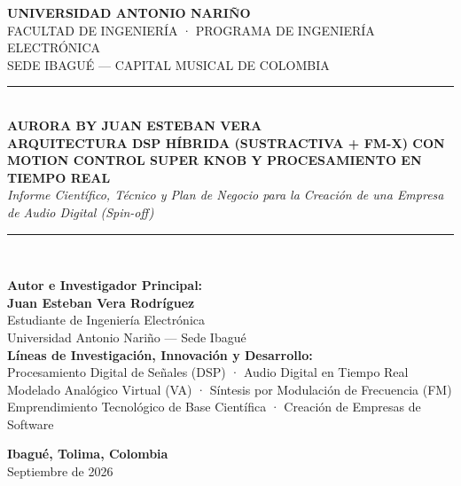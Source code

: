 \documentclass[11pt,a4paper]{article}
\begin{document}
\begin{titlepage}
    \centering
    \vspace*{0.5cm}
    
    {\scshape\LARGE \textbf{UNIVERSIDAD ANTONIO NARIÑO}}\\[0.3cm]
    {\scshape\large FACULTAD DE INGENIERÍA · PROGRAMA DE INGENIERÍA ELECTRÓNICA}\\[0.15cm]
    {\small SEDE IBAGUÉ — CAPITAL MUSICAL DE COLOMBIA}\\[1.5cm]
    
    \rule{\linewidth}{1.8pt}\\[0.4cm]
    {\Huge \bfseries \textcolor{uanblue}{AURORA BY JUAN ESTEBAN VERA}}\\[0.35cm]
    {\Large \bfseries ARQUITECTURA DSP HÍBRIDA (SUSTRACTIVA + FM-X) CON MOTION CONTROL SUPER KNOB Y PROCESAMIENTO EN TIEMPO REAL}\\[0.25cm]
    {\large \itshape Informe Científico, Técnico y Plan de Negocio para la Creación de una Empresa de Audio Digital (\textit{Spin-off})}\\[0.4cm]
    \rule{\linewidth}{1.8pt}\\[2.0cm]
    
    \begin{minipage}{0.85\textwidth}
        \centering
        \textbf{Autor e Investigador Principal:}\\
        {\Large \textbf{Juan Esteban Vera Rodríguez}}\\[0.15cm]
        {\small Estudiante de Ingeniería Electrónica}\\
        {\small Universidad Antonio Nariño — Sede Ibagué}\\[1.2cm]
        
        \textbf{Líneas de Investigación, Innovación y Desarrollo:}\\
        {\small Procesamiento Digital de Señales (DSP) · Audio Digital en Tiempo Real}\\
        {\small Modelado Analógico Virtual (VA) · Síntesis por Modulación de Frecuencia (FM)}\\
        {\small Emprendimiento Tecnológico de Base Científica · Creación de Empresas de Software}
    \end{minipage}
    
    \vfill
    {\large \textbf{Ibagué, Tolima, Colombia}}\\
    {\small Septiembre de 2026}
\end{titlepage}
\end{document}
